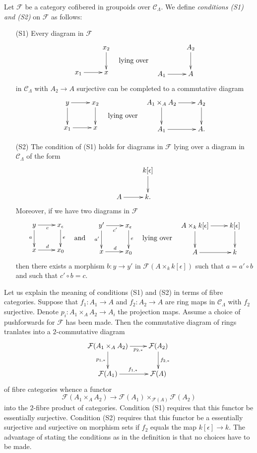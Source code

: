 \begin{definition}
\label{definition-S1-S2}
Let $\mathcal{F}$ be a category cofibered in groupoids over $\mathcal 
C_\Lambda$. We define {\it conditions (S1) and (S2)}
on $\mathcal{F}$ as follows:
\begin{enumerate}
\item[(S1)] Every diagram in $\mathcal{F}$
$$
\vcenter{
\xymatrix{
           & x_2 \ar[d] \\
x_1 \ar[r] & x   
}
}
\quad\text{lying over}\quad
\vcenter{
\xymatrix{
           & A_2 \ar[d] \\
A_1 \ar[r] & A   
}
}
$$  
in $\mathcal{C}_\Lambda$ with $A_2 \to A$ surjective can be completed 
to a commutative diagram
$$
\vcenter{
\xymatrix{
y \ar[r] \ar[d] & x_2 \ar[d] \\
x_1 \ar[r]      & x   
}
}
\quad\text{lying over}\quad
\vcenter{
\xymatrix{
A_1 \times_{A} A_2 \ar[r] \ar[d] & A_2 \ar[d] \\ 
A_1 \ar[r]      & A.   
}
}
$$
\item[(S2)]
The condition of (S1) holds for diagrams in $\mathcal{F}$ lying over 
a diagram in $\mathcal{C}_\Lambda$ of the form
$$
\xymatrix{
          & k[\epsilon] \ar[d] \\
A  \ar[r] & k.
}
$$  
Moreover, if we have two diagrams in $\mathcal{F}$
$$
\vcenter{
\xymatrix{
y \ar[r]_c \ar[d]_a & x_\epsilon \ar[d]^e \\
x \ar[r]^d          & x_0
}
}
\quad\text{and}\quad
\vcenter{
\xymatrix{
y' \ar[r]_{c'} \ar[d]_{a'} & x_\epsilon \ar[d]^e \\
x \ar[r]^d                 & x_0
}
}
\quad\text{lying over}\quad
\vcenter{
\xymatrix{
A \times_{k} k[\epsilon] \ar[r] \ar[d] & k[\epsilon] \ar[d] \\
A  \ar[r] & k 
}
}
$$  
then there exists a morphism $b : y \to y'$ in
$\mathcal{F}(A \times_{k} k[\epsilon])$ such that $a = a' \circ b$
and such that $c' \circ b = c$.
\end{enumerate}
\end{definition}

\noindent
Let us explain the meaning of conditions (S1) and (S2) in terms of
fibre categories. Suppose that $f_1 : A_1 \to A$ and $f_2 : A_2 \to A$ are
ring maps in $\mathcal{C}_\Lambda$ with $f_2$ surjective.
Denote $p_i : A_1 \times_A A_2 \to A_i$ the projection maps.
Assume a choice of pushforwards for $\mathcal{F}$ has been made.
Then the commutative diagram of rings tranlates into a $2$-commutative diagram
$$
\xymatrix{
\mathcal{F}(A_1 \times_A A_2) \ar[r]_-{p_{2, *}} \ar[d]_{p_{1, *}} &
\mathcal{F}(A_2) \ar[d]^{f_{2, *}} \\
\mathcal{F}(A_1) \ar[r]^{f_{1, *}} & \mathcal{F}(A)
}
$$
of fibre categories whence a functor
$$
\mathcal{F}(A_1 \times_A A_2) \to
\mathcal{F}(A_1) \times_{\mathcal{F}(A)} \mathcal{F}(A_2)
$$
into the $2$-fibre product of categories.
Condition (S1) requires that this functor be essentially surjective.
Condition (S2) requires that this functor be a essentially surjective
and surjective on morphism sets if $f_2$ equals the map $k[\epsilon] \to k$.
The advantage of stating the conditions as in the definition
is that no choices have to be made.

